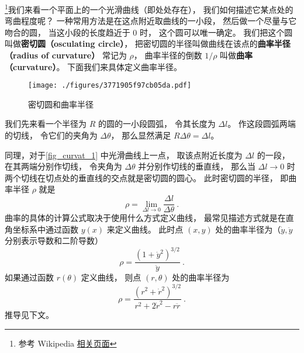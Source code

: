 

\footnote{参考 Wikipedia \href{https://en.wikipedia.org/wiki/Curvature}{相关页面}}我们来看一个平面上的一个光滑曲线（即处处存在）， 我们如何描述它某点处的弯曲程度呢？ 一种常用方法是在这点附近取曲线的一小段， 然后做一个尽量与它吻合的圆， 当这小段的长度趋近于 0 时， 这个圆可以唯一确定。 我们把这个圆叫做\textbf{密切圆（osculating circle）}， 把密切圆的半径叫做曲线在该点的\textbf{曲率半径（radius of curvature）} 常记为 $\rho$， 曲率半径的倒数 $1/\rho$ 叫做\textbf{曲率（curvature）}。 下面我们来具体定义曲率半径。
\begin{figure}[ht]
\centering
\texttt{[image: ./figures/3771905f97cb05da.pdf]}
\caption{密切圆和曲率半径} \label{fig_curvat_1}
\end{figure}

我们先来看一个半径为 $R$ 的圆的一小段圆弧， 令其长度为 $\Delta l$。 作这段圆弧两端的切线， 令它们的夹角为 $\Delta \theta$， 那么显然满足 $R \Delta\theta = \Delta l$。

同理，对于\autoref{fig_curvat_1} 中光滑曲线上一点， 取该点附近长度为 $\Delta l$ 的一段， 在其两端分别作切线， 令夹角为 $\Delta\theta$ 并分别作切线的垂直线， 那么当 $\Delta l \to 0$ 时两个切线在切点处的垂直线的交点就是密切圆的圆心。 此时密切圆的半径， 即曲率半径 $\rho$ 就是
\begin{equation}\label{eq_curvat_3}
\rho = \lim_{\Delta l \to 0} \frac{\Delta l}{\Delta \theta}~.
\end{equation}
曲率的具体的计算公式取决于使用什么方式定义曲线， 最常见描述方式就是在直角坐标系中通过函数 $y(x)$ 来定义曲线。 此时点 $(x, y)$ 处的曲率半径为（$\dot y, \ddot y$ 分别表示导数和二阶导数）
\begin{equation}
\rho = \frac{(1 + \dot y^2)^{3/2}}{\ddot y}~.
\end{equation}
如果通过函数 $r(\theta)$ 定义曲线， 则点 $(r, \theta)$ 处的曲率半径为
\begin{equation}
\rho = \frac{(r^2 + \dot r^2)^{3/2}}{r^2 + 2\dot r^2 - r\ddot r}~.
\end{equation}
推导见下文。

